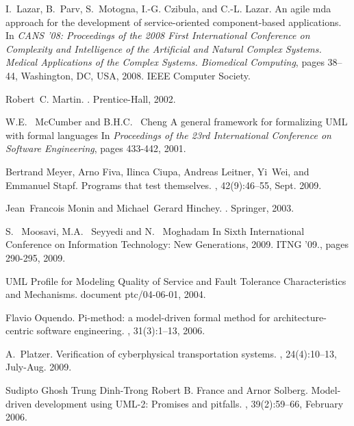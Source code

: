 \begin{thebibliography}{}
I.~Lazar, B.~Parv, S.~Motogna, I.-G. Czibula, and C.-L. Lazar.
\newblock An agile mda approach for the development of service-oriented
  component-based applications.
\newblock In {\em CANS '08: Proceedings of the 2008 First International
  Conference on Complexity and Intelligence of the Artificial and Natural
  Complex Systems. Medical Applications of the Complex Systems. Biomedical
  Computing}, pages 38--44, Washington, DC, USA, 2008. IEEE Computer Society.

Robert~C. Martin.
.
\newblock Prentice-Hall, 2002.

W.E.~ McCumber and B.H.C.~ Cheng
\newblock A general framework for formalizing UML with formal languages
\newblock In {\em Proceedings of the 23rd International Conference on Software Engineering}, 
 pages 433-442, 2001.

Bertrand Meyer, Arno Fiva, Ilinca Ciupa, Andreas Leitner, Yi~Wei, and Emmanuel
  Stapf.
\newblock Programs that test themselves.
, 42(9):46--55, Sept. 2009.

Jean~Francois Monin and Michael~Gerard Hinchey.
.
\newblock Springer, 2003.

S.~ Moosavi, M.A.~ Seyyedi and N.~ Moghadam
\newblock In Sixth International Conference on Information Technology: New Generations, 2009. ITNG '09.,
  pages 290-295, 2009.

UML Profile for Modeling Quality of Service and Fault Tolerance Characteristics and Mechanisms.
\newblock document ptc/04-06-01, 2004.

Flavio Oquendo.
\newblock Pi-method: a model-driven formal method for architecture-centric
  software engineering.
, 31(3):1--13, 2006.

A.~Platzer.
\newblock Verification of cyberphysical transportation systems.
, 24(4):10--13, July-Aug. 2009.

Sudipto Ghosh Trung Dinh-Trong {Robert B. France} and Arnor Solberg.
\newblock Model-driven development using {UML}-2: Promises and pitfalls.
, 39(2):59--66, February 2006.


\end{thebibliography}
